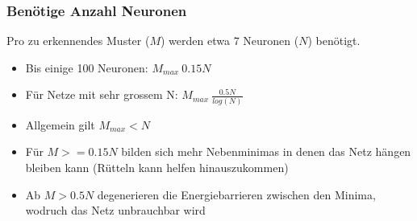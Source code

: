 \subsubsection{Benötige Anzahl Neuronen}
Pro zu erkennendes Muster ($M$) werden etwa 7 Neuronen ($N$) benötigt.
\begin{itemize}
	\item Bis einige 100 Neuronen: $M_{max} ~ 0.15N$
	\item Für Netze mit sehr grossem N: $M_{max} ~ \frac{0.5N}{log(N)}$
	\item Allgemein gilt $M_{max} < N$
	\item Für $M >= 0.15N$ bilden sich mehr Nebenminimas in denen das Netz
		hängen bleiben kann (Rütteln kann helfen hinauszukommen)
	\item Ab $M > 0.5N$ degenerieren die Energiebarrieren zwischen den Minima,
		wodruch das Netz unbrauchbar wird
\end{itemize}


